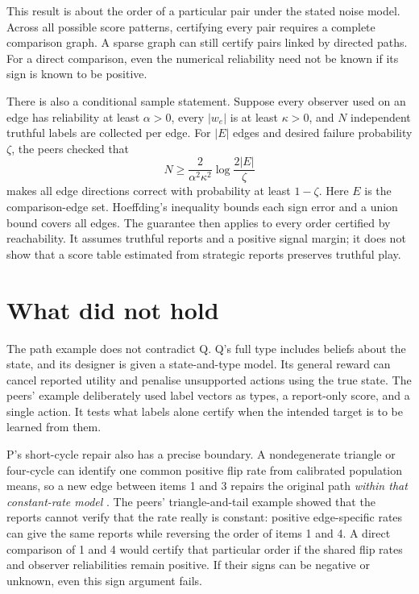 \documentclass{article}
\begin{document}
This result is about the order of a particular pair under the stated noise model. Across all possible score
patterns, certifying every pair requires a complete comparison graph. A sparse graph can still certify pairs
linked by directed paths. For a direct comparison, even the numerical reliability need not be known if its
sign is known to be positive.

There is also a conditional sample statement. Suppose every observer used on an edge has reliability at least
\(\alpha>0\), every \(|w_e|\) is at least \(\kappa>0\), and \(N\) independent truthful labels are collected
per edge. For \(|E|\) edges and desired failure probability \(\zeta\), the peers checked that
\[
N\geq\frac{2}{\alpha^2\kappa^2}
\log\frac{2|E|}{\zeta}
\]
makes all edge directions correct with probability at least \(1-\zeta\). Here \(E\) is the comparison-edge
set. Hoeffding's inequality bounds each sign error and a union bound covers all edges. The guarantee then
applies to every order certified by reachability. It assumes truthful reports and a positive signal margin; it
does not show that a score table estimated from strategic reports preserves truthful play.

\section{What did not hold}

The path example does not contradict Q. Q's full type includes beliefs about the state, and its designer is
given a state-and-type model. Its general reward can cancel reported utility and penalise unsupported actions
using the true state. The peers' example deliberately used label vectors as types, a report-only score, and a
single action. It tests what labels alone certify when the intended target is to be learned from them.

P's short-cycle repair also has a precise boundary. A nondegenerate triangle or four-cycle can identify one
common positive flip rate from calibrated population means, so a new edge between items 1 and 3 repairs the
original path \emph{within that constant-rate model} \cite{P}. The peers' triangle-and-tail example showed
that the reports cannot verify that the rate really is constant: positive edge-specific rates can give the
same reports while reversing the order of items 1 and 4. A direct comparison of 1 and 4 would certify that
particular order if the shared flip rates and observer reliabilities remain positive. If their signs can be
negative or unknown, even this sign argument fails.
\end{document}
